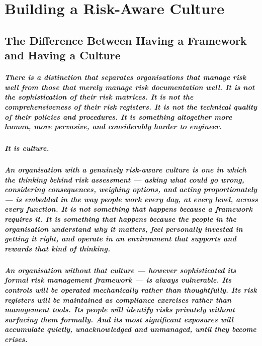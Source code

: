\chapter{Building a Risk-Aware Culture}
\label{chap:Building a Risk-Aware Culture}

\section{The Difference Between Having a Framework and Having a Culture}
\paragraph{There is a distinction that separates organisations that manage risk well from those that merely manage risk documentation well. It is not the sophistication of their risk matrices. It is not the comprehensiveness of their risk registers. It is not the technical quality of their policies and procedures. It is something altogether more human, more pervasive, and considerably harder to engineer.}
\paragraph{It is \textbf{culture}.}
\paragraph{An organisation with a genuinely risk-aware culture is one in which the thinking behind risk assessment — asking what could go wrong, considering consequences, weighing options, and acting proportionately — is embedded in the way people work every day, at every level, across every function. It is not something that happens because a framework requires it. It is something that happens because the people in the organisation understand why it matters, feel personally invested in getting it right, and operate in an environment that supports and rewards that kind of thinking.}
\paragraph{An organisation without that culture — however sophisticated its formal risk management framework — is always vulnerable. Its controls will be operated mechanically rather than thoughtfully. Its risk registers will be maintained as compliance exercises rather than management tools. Its people will identify risks privately without surfacing them formally. And its most significant exposures will accumulate quietly, unacknowledged and unmanaged, until they become crises.}
